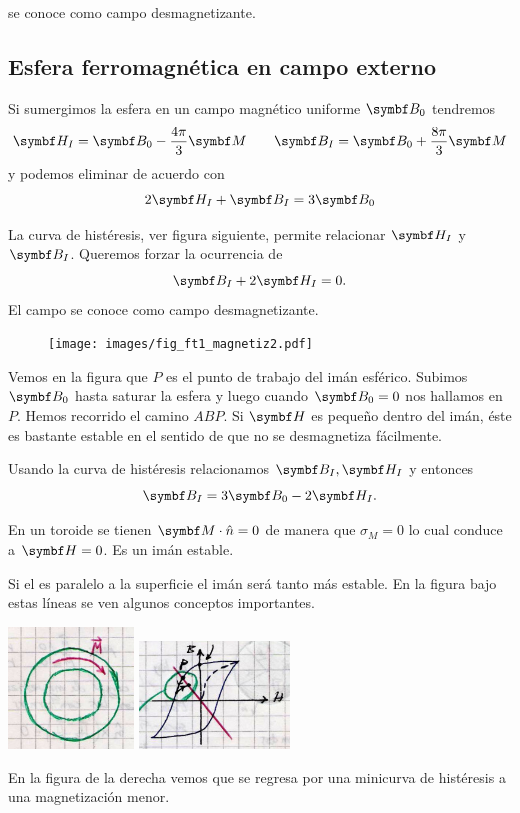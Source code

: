 \documentclass[10pt,oneside]{CBFT_book}
\begin{document}
 se conoce como campo desmagnetizante.


\subsection{Esfera ferromagnética en campo externo}

Si sumergimos la esfera en un campo magnético uniforme $\vb{B}_0$ tendremos
\[
	\vb{H}_I = \vb{B}_0 - \frac{4\pi}{3} \vb{M} \qquad \vb{B}_I = \vb{B}_0 + \frac{8\pi}{3} \vb{M}
\]
y podemos eliminar  de acuerdo con
\[
	2\vb{H}_I + \vb{B}_I = 3\vb{B}_0
\]

La curva de histéresis, ver figura siguiente, permite relacionar $ \vb{H}_I $ y $ \vb{B}_I$.
Queremos forzar la ocurrencia de 
\[
	\vb{B}_I + 2 \vb{H}_I = 0.
\]
El campo  se conoce como campo desmagnetizante.

\begin{figure}[htb]
	\begin{center}
	\texttt{[image: images/fig\_ft1\_magnetiz2.pdf]}	 
	\end{center}
	\caption{}
\end{figure} 

Vemos en la figura que $P$ es el punto de trabajo del imán esférico. 
Subimos $\vb{B}_0$ hasta saturar la esfera y luego cuando $\vb{B}_0 = 0$ nos hallamos en $P$. 
Hemos recorrido el camino $ABP$. Si $\vb{H}$ es pequeño dentro del imán, éste es bastante
estable en el sentido de que no se desmagnetiza fácilmente.

Usando la curva de histéresis relacionamos $\vb{B}_I, \vb{H}_I$ y entonces
\[
	\vb{B}_I = 3 \vb{B}_0  - 2 \vb{H}_I.
\]


En un toroide se tienen $\vb{M}\cdot \hat{n} = 0 $ de manera que $\sigma_M=0$ lo cual conduce
a $\vb{H}=0$. Es un imán estable.

Si el  es paralelo a la superficie el imán será tanto más estable. En la figura bajo
estas líneas se ven algunos conceptos importantes.

\includegraphics[width=0.25\textwidth]{images/fig_ft1_magnetiz3.jpg}
\includegraphics[width=0.3\textwidth]{images/fig_ft1_magnetiz4.jpg}

En la figura de la derecha vemos que se regresa por una minicurva de histéresis a una magnetización
menor.


\end{document}
